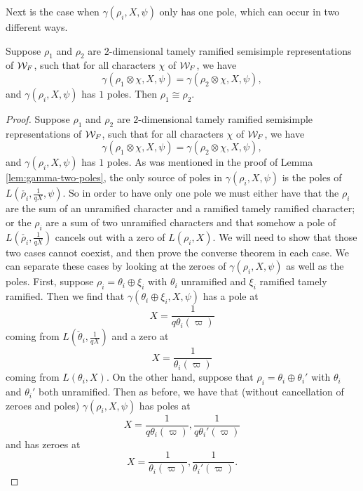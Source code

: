Next is the case when $\gamma(\rho_i, X,\psi)$ only has one pole, which can occur in two different ways. 

\begin{lemma}
  \label{lem:gamma-one-pole}
  Suppose $\rho_1$ and $\rho_2$ are $2$-dimensional tamely ramified semisimple representations of $\mathcal{W}_F$, such that for all characters $\chi$ of $\mathcal{W}_F$, we have
  \[\gamma(\rho_1 \otimes \chi,X,\psi) = \gamma(\rho_2 \otimes \chi,X,\psi),\]
  and $\gamma(\rho_i,X,\psi)$ has $1$ poles.
  Then $\rho_1 \cong \rho_2$.
\end{lemma}

\begin{proof}
  Suppose $\rho_1$ and $\rho_2$ are $2$-dimensional tamely ramified semisimple representations of $\mathcal{W}_F$, such that for all characters $\chi$ of $\mathcal{W}_F$, we have
  \[\gamma(\rho_1 \otimes \chi,X,\psi) = \gamma(\rho_2 \otimes \chi,X,\psi),\]
  and $\gamma(\rho_i,X,\psi)$ has $1$ poles.
  As was mentioned in the proof of Lemma \ref{lem:gamma-two-poles}, the only source of poles in $\gamma(\rho_i,X,\psi)$ is the poles of $L(\check{\rho_i},\frac{1}{qX},\psi)$.
  So in order to have only one pole we must either have that the $\rho_i$ are the sum of an unramified character and a ramified tamely ramified character; or the $\rho_i$ are a sum of two unramified characters and that somehow a pole of $L(\check{\rho_i},\frac{1}{qX})$ cancels out with a zero of $L(\rho_i,X)$.
  We will need to show that those two cases cannot coexist, and then prove the converse theorem in each case.
  We can separate these cases by looking at the zeroes of $\gamma(\rho_i,X,\psi)$ as well as the poles.
  First, suppose $\rho_i = \theta_i \oplus \xi_i$ with $\theta_i$ unramified and $\xi_i$ ramified tamely ramified.
  Then we find that $\gamma(\theta_i \oplus \xi_i,X,\psi)$ has a pole at
  \[X= \frac{1}{q\theta_i(\varpi)}\]
  coming from $L(\check{\theta}_i,\frac{1}{qX})$ and a zero at
  \[X = \frac{1}{\theta_i(\varpi)}\]
  coming from $L(\theta_i,X)$.
  On the other hand, suppose that $\rho_i = \theta_i \oplus \theta_i'$ with $\theta_i$ and $\theta_i'$ both unramified.
  Then as before, we have that (without cancellation of zeroes and poles)  $\gamma(\rho_i,X,\psi)$ has poles at
  \[X = \frac{1}{q\theta_i(\varpi)}, \frac{1}{q\theta_i'(\varpi)}\]
  and has zeroes at
  \[X = \frac{1}{\theta_i(\varpi)}, \frac{1}{\theta_i'(\varpi)}.\]



\end{proof}
